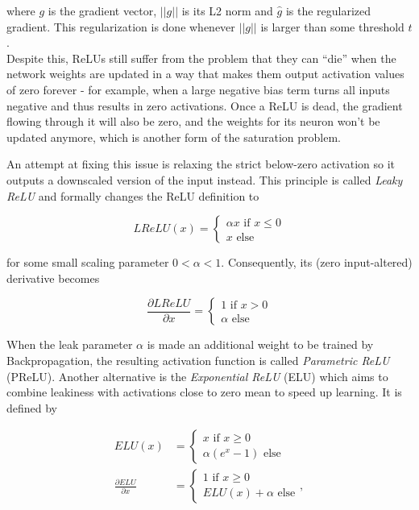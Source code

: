 \noindent where $g$ is the gradient vector, $||g||$ is its L2 norm and $\hat{g}$ is the regularized gradient. This regularization is done whenever $||g||$ is larger than some threshold $t$.\\

\noindent Despite this, ReLUs still suffer from the problem that they can ``die'' when the network weights are updated in a way that makes them output activation values of zero forever - for example, when a large negative bias term turns all inputs negative and thus results in zero activations. Once a ReLU is dead, the gradient flowing through it will also be zero, and the weights for its neuron won't be updated anymore, which is another form of the saturation problem.

An attempt at fixing this issue is relaxing the strict below-zero activation so it outputs a downscaled version of the input instead. This principle is called \textit{Leaky ReLU} \cite{lrelu} and formally changes the ReLU definition to 

\[  LReLU(x) = \begin{cases}
			\alpha x \text{ if } x \leq 0\\
			x \text{ else}
		 \end{cases}
\]

\noindent for some small scaling parameter $0 < \alpha < 1$. Consequently, its (zero input-altered) derivative becomes

\[ \frac{\partial LReLU}{\partial x} = \begin{cases}
							1 \text { if } x > 0\\
							\alpha \text{ else}
						        \end{cases}
\]

\noindent When the leak parameter $\alpha$ is made an additional weight to be trained by Backpropagation, the resulting activation function is called \textit{Parametric ReLU} (PReLU). \cite{rectifiers} Another alternative is the \textit{Exponential ReLU} (ELU) \cite{elu} which aims to combine leakiness with activations close to zero mean to speed up learning. It is defined by

\begin {align}
	ELU(x) &= \begin{cases}
			x \text { if } x \geq 0\\
			\alpha(e^x - 1) \text{ else}
		     \end{cases}\\
	\frac{\partial ELU}{\partial x} &= \begin{cases}
								1 \text { if } x \geq 0\\
								ELU(x) + \alpha \text{ else}
		    				     \end{cases},
\end {align}


